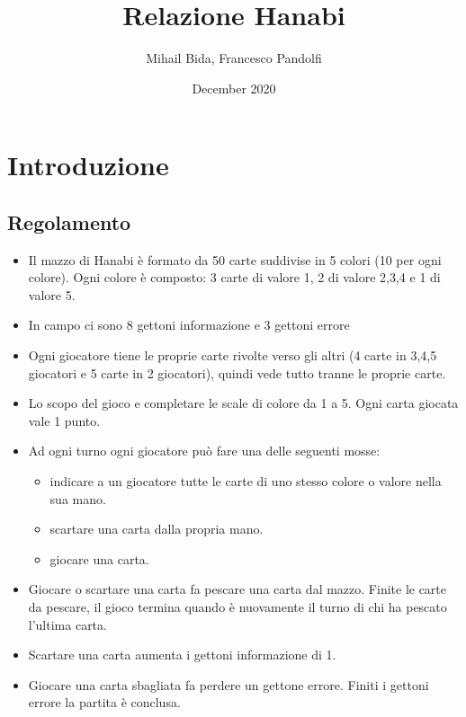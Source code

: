 \documentclass{article}
\title{Relazione Hanabi}
\author{Mihail Bida, Francesco Pandolfi }
\date{December 2020}
\begin{document}
\maketitle

\section{Introduzione}
\subsection{Regolamento}
\begin{itemize}
    \item Il mazzo di Hanabi è formato da 50 carte suddivise in 5 colori (10 per ogni colore). Ogni colore è composto: 3 carte di valore 1, 2 di valore 2,3,4 e 1 di valore 5.
    \item In campo ci sono 8 gettoni informazione e 3 gettoni errore
    \item Ogni giocatore tiene le proprie carte rivolte verso gli altri (4 carte in 3,4,5 giocatori e 5 carte in 2 giocatori), quindi vede tutto tranne le proprie carte.
    \item Lo scopo del gioco e completare le scale di colore da 1 a 5. Ogni carta giocata vale 1 punto.
    \item 
    {Ad ogni turno ogni giocatore può fare una delle seguenti mosse:
    \begin{itemize}
        \item indicare a un giocatore tutte le carte di uno stesso colore o valore nella sua mano.
        \item scartare una carta dalla propria mano.
        \item giocare una carta.
    \end{itemize}}
    \item Giocare o scartare una carta fa pescare una carta dal mazzo. Finite le carte da pescare, il gioco termina quando è nuovamente il turno di chi ha pescato l’ultima carta.
    \item Scartare una carta aumenta i gettoni informazione di 1.
    \item Giocare una carta sbagliata fa perdere un gettone errore. Finiti i gettoni errore la partita è conclusa.
\end{itemize}
\end{document}

